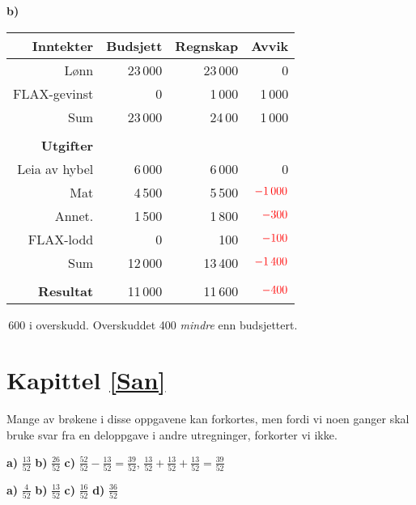 \textbf{b)}\\
\begin{tabular}{r r r r}
	\textbf{Inntekter} & Budsjett & Regnskap & Avvik \\ \hline 
	Lønn & 23\,000 & 23\,000 & 0\\
	FLAX-gevinst & 0& 1\,000 & 1\,000\\ \hline
	Sum & 23\,000 & 24\,00 & 1\,000\\\hline 
	& \\
	\textbf{Utgifter} & \\ \hline
	Leia av hybel & 6\,000 & 6\,000 &0 \\
	Mat & 4\,500 & 5\,500 & $ \color{red}-1\,000 $\\
	Annet. & 1\,500 & 1\,800 & $ \color{red}-300 $\\ 
	FLAX-lodd & 0 & 100 & $ \color{red}-100 $ \\
	\hline
	Sum & 12\,000 & 13\,400 & $ \color{red}-1\,400 $\\ \hline
	& \\ \hline
	\textbf{Resultat} & 11\,000 & 11\,600 & $ \color{red}-400 $ \\ \hline
\end{tabular}\,600 i overskudd. Overskuddet 400 \textsl{mindre} enn budsjettert.

\section*{Kapittel \ref*{San}}
\obs Mange av brøkene i disse oppgavene kan forkortes, men fordi vi noen ganger skal bruke svar fra en deloppgave i andre utregninger, forkorter vi ikke. \vsk

\textbf{a)} $ \frac{13}{52}$
\textbf{b)} $ \frac{26}{52} $
\textbf{c)} $ \frac{52}{52}-\frac{13}{52}=\frac{39}{52} $, $ \frac{13}{52}+\frac{13}{52}+\frac{13}{52}=\frac{39}{52} $

\textbf{a)} $ \frac{4}{52} $ 
\textbf{b)} $ \frac{13}{52} $
\textbf{c)} $ \frac{16}{52} $
\textbf{d)} $ \frac{36}{52} $


